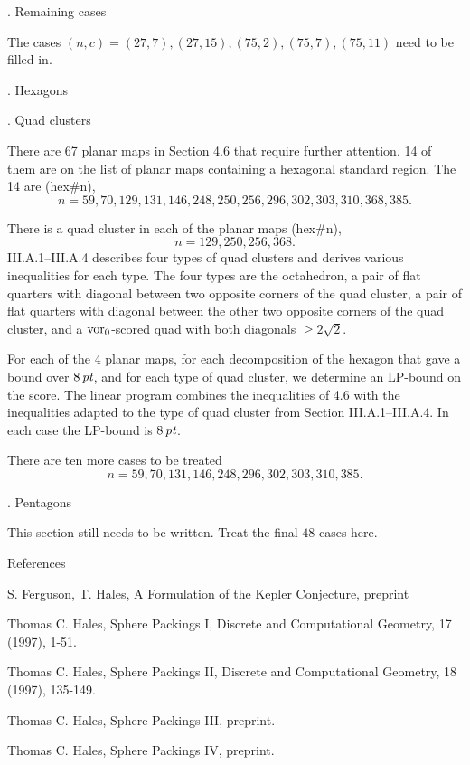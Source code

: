 .  Remaining cases\endsubhead

The cases $(n,c)=(27,7),(27,15),(75,2),(75,7),(75,11)$ need
to be filled in.

. Hexagons\endhead

. Quad clusters\endsubhead

There are 67 planar maps in Section 4.6 that require further attention.
14 of them are on the list of planar maps containing a hexagonal
standard region.  The 14 are (hex\#n), 
$$n= 59,70,129,131,146,248,250,256,296,302,303,310,368,385.$$

There is a quad cluster in each of the planar maps (hex\#n),
$$n=129,250,256,368.$$  III.A.1--III.A.4 describes four types of quad
clusters and derives various inequalities for each type.  The
four types are the octahedron, a pair of flat quarters with diagonal
between two opposite corners of the quad cluster, a pair of
flat quarters with diagonal between the other two opposite corners
of the quad cluster, and a $\operatorname{vor}_0$-scored quad with both diagonals
$\ge2\sqrt2$.

For each of the 4 planar maps, for each decomposition of the
hexagon that gave a bound over $8\,\hbox{\it pt}$, and for each type of
quad cluster, we determine an LP-bound on the score.
The linear program combines the
inequalities of 4.6 with the inequalities adapted to the type
of quad cluster from Section III.A.1--III.A.4.  
In each case the LP-bound
is $8\,\hbox{\it pt}$.

\endsubhead

There are ten more cases to be treated
	$$n=59,70,131,146,248,296,302,303,310,385.$$

. Pentagons\endhead

This section still needs to be written.  Treat the final $48$
cases here.


\vfill\eject
{}\parskip
\head References\endhead

\noindent
[F] S. Ferguson, T. Hales, A Formulation of the Kepler
    Conjecture, preprint

\noindent
[I] Thomas C. Hales, Sphere Packings I,
    Discrete and Computational Geometry, 17 (1997), 1-51.

\noindent
[II] Thomas C. Hales, Sphere Packings II,
    Discrete and Computational Geometry, 18 (1997), 135-149.

\noindent
[III] Thomas C. Hales, Sphere Packings III, preprint.

\noindent
[IV] Thomas C. Hales, Sphere Packings IV, preprint.
 

